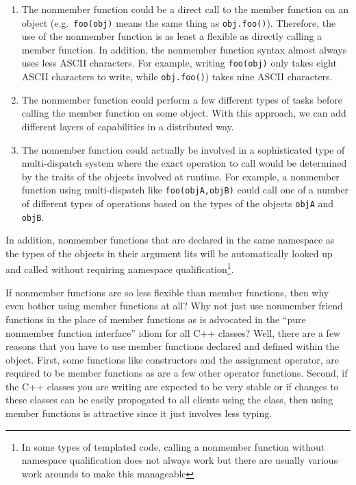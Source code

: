 \documentclass[pdf,ps2pdf,11pt]{SANDreport}
\begin{document}
\begin{enumerate}

{}\item{}The nonmember function could be a direct call to the member function on an
object (e.g.\ {}\texttt{foo(obj)} means the same thing as
{}\texttt{obj.foo()}).  Therefore, the use of the nonmember function is as
least a flexible as directly calling a member function.  In addition, the
nonmember function syntax almost always uses less ASCII characters.  For
example, writing {}\texttt{foo(obj)} only takes eight ASCII characters to
write, while {}\texttt{obj.foo()}) takes nine ASCII characters.

{}\item{}The nonmember function could perform a few different types of tasks
before calling the member function on some object.  With this approach, we can
add different layers of capabilities in a distributed way.

{}\item{}The nomember function could actually be involved in a sophisticated
type of multi-dispatch system where the exact operation to call would be
determined by the traits of the objects involved at runtime.  For example, a
nonmember function using multi-dispatch like {}\texttt{foo(objA,objB)} could
call one of a number of different types of operations based on the types of
the objects {}\texttt{objA} and {}\texttt{objB}.

\end{enumerate}

In addition, nonmember functions that are declared in the same namespace as
the types of the objects in their argument lits will be automatically looked
up and called without requiring namespace qualification\footnote{In some types
of templated code, calling a nonmember function without namespace
qualification does not always work but there are usually various work arounds
to make this manageable}.

If nonmember functions are so less flexible than member functions, then why
even bother using member functions at all?  Why not just use nonmember friend
functions in the place of member functions as is advocated in the ``pure
nonmember function interface'' idiom for all C++ classes?  Well, there are a
few reasons that you have to use member functions declared and defined within
the object.  First, some functions like constructors and the assignment
operator, are required to be member functions as are a few other operator
functions.  Second, if the C++ classes you are writing are expected to be very
stable or if changes to these classes can be easily propogated to all clients
using the class, then using member functions is attractive since it just
involves less typing.
\end{document}
